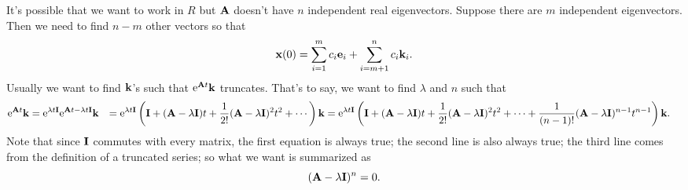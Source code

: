 \documentclass[hyperref, a4paper]{article}
\newcommand*{\ee}{\mathrm{e}}
\def\\{}%
\def\mathbb#1{#1}%
\newcommand*{\mat}[1]{\vb{#1}}
\begin{document}
It's possible that we want to work in $\mathbb{R}$ 
but $\mat{A}$ doesn't have $n$ independent real eigenvectors.
Suppose there are $m$ independent eigenvectors.
Then we need to find $n - m$ other vectors so that
\begin{equation}
    \vb{x}(0) = \sum_{i=1}^{m} c_i \vb{e}_i + \sum_{i=m+1}^{n} c_i \vb{k}_i.
\end{equation}
Usually we want to find $\vb{k}$'s such that $\ee^{\mat{A} t} \vb{k}$ truncates.
That's to say, we want to find $\lambda$ and $n$ such that 
\begin{equation}
    \begin{aligned}
        \ee^{\mat{A} t} \vb{k} &= 
        \ee^{\lambda t \mat{I}} \ee^{\mat{A} t - \lambda t \mat{I}} \vb{k} \\
        &= \ee^{\lambda t \mat{I}} \left(
            \mat{I} + (\mat{A} - \lambda \mat{I}) t 
            + \frac{1}{2!} (\mat{A} - \lambda \mat{I})^2 t^2 + \cdots 
        \right) \vb{k} \\
        &= \ee^{\lambda t \mat{I}} \left(
            \mat{I} + (\mat{A} - \lambda \mat{I}) t 
            + \frac{1}{2!} (\mat{A} - \lambda \mat{I})^2 t^2 + \cdots + 
            \frac{1}{(n-1)!} (\mat{A} - \lambda \mat{I})^{n-1} t^{n-1}
        \right) \vb{k}.
    \end{aligned}
\end{equation}
Note that since $\mat{I}$ commutes with every matrix, 
the first equation is always true;
the second line is also always true;
the third line comes from the definition of a truncated series;
so what we want is summarized as 
\begin{equation}
    (\mat{A} - \lambda \mat{I})^n = 0.
\end{equation}
\end{document}
